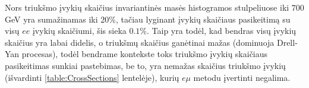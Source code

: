 \documentclass[a4paper, 12pt]{article}
\newlength\q
\begin{document}
Nors triukšmo įvykių skaičius invariantinės masės histogramos stulpeliuose iki $700$ GeV yra sumažinamas iki $20\%$, tačiau lyginant įvykių skaičiaus pasikeitimą su visų $ee$ įvykių skaičiumi, šis sieka $0.1\%$. Taip yra todėl, kad bendras visų įvykių skaičius yra labai didelis, o triukšmų skaičius ganėtinai mažas (dominuoja Drell-Yan procesas), todėl bendrame kontekste toks triukšmo įvykių skaičiaus pasikeitimas sunkiai pastebimas, be to, yra nemažas skaičius triukšmo įvykių (išvardinti \ref{table:CrossSections} lentelėje), kurių $e\mu$ metodu įvertinti negalima.
\end{document}
